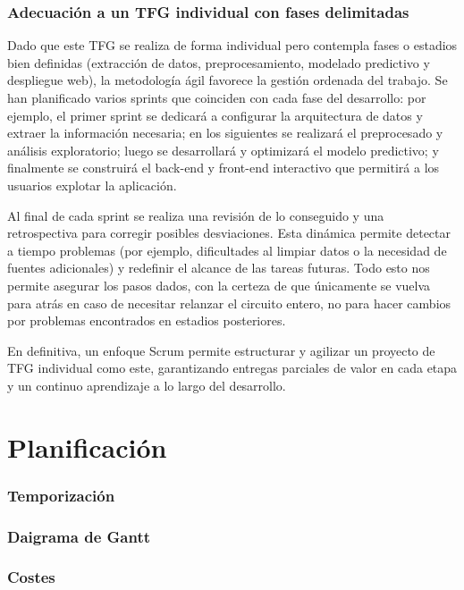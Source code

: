 \documentclass[a4paper,11pt]{book}
\begin{document}
\subsection{Adecuación a un TFG individual con fases delimitadas}
Dado que este TFG se realiza de forma individual pero contempla fases o estadios bien definidas (extracción de datos, preprocesamiento, modelado predictivo y despliegue web), la metodología ágil favorece la gestión ordenada del trabajo. Se han planificado varios sprints que coinciden con cada fase del desarrollo: por ejemplo, el primer sprint se dedicará a configurar la arquitectura de datos y extraer la información necesaria; en los siguientes se realizará el preprocesado y análisis exploratorio; luego se desarrollará y optimizará el modelo predictivo; y finalmente se construirá el back-end y front-end interactivo que permitirá a los usuarios explotar la aplicación. 

Al final de cada sprint se realiza una revisión de lo conseguido y una retrospectiva para corregir posibles desviaciones. Esta dinámica permite detectar a tiempo problemas (por ejemplo, dificultades al limpiar datos o la necesidad de fuentes adicionales) y redefinir el alcance de las tareas futuras. Todo esto nos permite asegurar los pasos dados, con la certeza de que únicamente se vuelva para atrás en caso de necesitar relanzar el circuito entero, no para hacer cambios por problemas encontrados en estadios posteriores.

En definitiva, un enfoque Scrum permite estructurar y agilizar un proyecto de TFG individual como este, garantizando entregas parciales de valor en cada etapa y un continuo aprendizaje a lo largo del desarrollo.




\chapter{Planificación}

\subsection{Temporización}

\subsection{Daigrama de Gantt}

\subsection{Costes}
\end{document}
